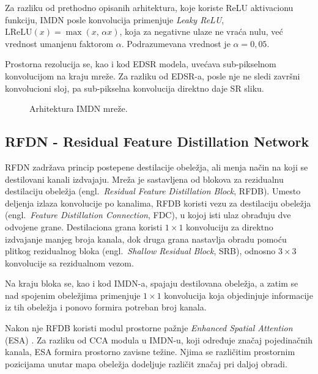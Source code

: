 \documentclass[12pt,a4paper]{article}
\begin{document}
Za razliku od prethodno opisanih arhitektura, koje koriste ReLU aktivacionu funkciju, IMDN posle konvolucija primenjuje \textit{Leaky ReLU}, $\mathrm{LReLU}(x) = \max(x,\, \alpha x)$, koja za negativne ulaze ne vraća nulu, već vrednost umanjenu faktorom $\alpha$. Podrazumevana vrednost je $\alpha = 0{,}05$.

Prostorna rezolucija se, kao i kod EDSR modela, uvećava sub-pikselnom konvolucijom na kraju mreže. Za razliku od EDSR-a, posle nje ne sledi završni konvolucioni sloj, pa sub-pikselna konvolucija direktno daje SR sliku.

\begin{figure}[H]
	\centering
	\resizebox{0.65\textwidth}{!}{}
	\caption{Arhitektura IMDN mreže.}
	\label{fig:imdn}
\end{figure}




\subsection{RFDN - Residual Feature Distillation Network}

RFDN \cite{RFDN} zadržava princip postepene destilacije obeležja, ali menja način na koji se destilovani kanali izdvajaju. Mreža je sastavljena od blokova za rezidualnu destilaciju obeležja (engl.\ \textit{Residual Feature Distillation Block}, RFDB). Umesto deljenja izlaza konvolucije po kanalima, RFDB koristi vezu za destilaciju obeležja (engl.\ \textit{Feature Distillation Connection}, FDC), u kojoj isti ulaz obrađuju dve odvojene grane. Destilaciona grana koristi $1\times1$ konvoluciju za direktno izdvajanje manjeg broja kanala, dok druga grana nastavlja obradu pomoću plitkog rezidualnog bloka (engl.\ \textit{Shallow Residual Block}, SRB), odnosno $3\times3$ konvolucije sa rezidualnom vezom.

Na kraju bloka se, kao i kod IMDN-a, spajaju destilovana obeležja, a zatim se nad spojenim obeležjima primenjuje $1\times1$ konvolucija koja objedinjuje informacije iz tih obeležja i ponovo formira potreban broj kanala. 

Nakon nje RFDB koristi modul prostorne pažnje \textit{Enhanced Spatial Attention} (ESA) \cite{RFANet}. Za razliku od CCA modula u IMDN-u, koji određuje značaj pojedinačnih kanala, ESA formira prostorno zavisne težine. Njima se različitim prostornim pozicijama unutar mapa obeležja dodeljuje različit značaj pri daljoj obradi.
\end{document}
